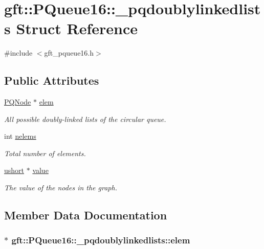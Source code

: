 \hypertarget{structgft_1_1PQueue16_1_1__pqdoublylinkedlists}{\section{gft\-:\-:P\-Queue16\-:\-:\-\_\-pqdoublylinkedlists Struct Reference}
\label{structgft_1_1PQueue16_1_1__pqdoublylinkedlists}
}


{\ttfamily \#include $<$gft\-\_\-pqueue16.\-h$>$}

\subsection*{Public Attributes}
\begin{DoxyCompactItemize}
\item 
\hyperlink{namespacegft_1_1PQueue16_a2dc28c8f2a9eaeb5d7d7ae7ec5429314}{P\-Q\-Node} $\ast$ \hyperlink{structgft_1_1PQueue16_1_1__pqdoublylinkedlists_a7ea91d6d755456e562d4ac1cd481cafe}{elem}
\begin{DoxyCompactList}\small\item\em All possible doubly-\/linked lists of the circular queue. \end{DoxyCompactList}\item 
int \hyperlink{structgft_1_1PQueue16_1_1__pqdoublylinkedlists_ae51ba2f93a5a4ac83e9c3f2baf63bdc7}{nelems}
\begin{DoxyCompactList}\small\item\em Total number of elements. \end{DoxyCompactList}\item 
\hyperlink{namespacegft_a878518cf75338c097e2c8e9b10bfb00d}{ushort} $\ast$ \hyperlink{structgft_1_1PQueue16_1_1__pqdoublylinkedlists_acac5733fab27f2e9c9c9b42ecf373d1e}{value}
\begin{DoxyCompactList}\small\item\em The value of the nodes in the graph. \end{DoxyCompactList}\end{DoxyCompactItemize}


\subsection{Member Data Documentation}
\hypertarget{structgft_1_1PQueue16_1_1__pqdoublylinkedlists_a7ea91d6d755456e562d4ac1cd481cafe}{
\subsubsection[{elem}]{$\ast$ gft\-::\-P\-Queue16\-::\-\_\-pqdoublylinkedlists\-::elem}}\label{structgft_1_1PQueue16_1_1__pqdoublylinkedlists_a7ea91d6d755456e562d4ac1cd481cafe}


